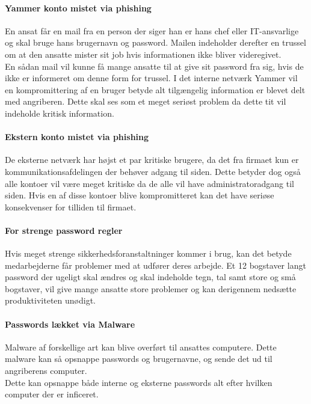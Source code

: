 \documentclass{article}
\begin{document}
\paragraph{Yammer konto mistet via phishing}
En ansat får en mail fra en person der siger han er hans chef eller
IT-ansvarlige og skal bruge hans brugernavn og password. Mailen 
indeholder derefter en trussel om at den ansatte mister sit job hvis 
informationen ikke bliver videregivet.\\
En sådan mail vil kunne få mange ansatte til at give sit password fra
sig, hvis de ikke er informeret om denne form for trussel. 
I det interne netværk Yammer vil en kompromittering af en bruger betyde alt tilgængelig information
er blevet delt med angriberen. 
Dette skal ses som et meget seriøst problem da dette tit vil indeholde kritisk information.

\paragraph{Ekstern konto mistet via phishing}
De eksterne netværk har højst et par kritiske brugere, da det fra firmaet kun er 
kommunikationsafdelingen der behøver adgang til siden. Dette betyder dog også
alle kontoer vil være meget kritiske da de alle vil have administratoradgang til
siden. Hvis en af disse kontoer blive kompromitteret kan det have seriøse konsekvenser
for tilliden til firmaet.

\paragraph{For strenge password regler}
Hvis meget strenge sikkerhedsforanstaltninger kommer i brug, kan det betyde
medarbejderne får problemer med at udfører deres arbejde. Et 12 bogstaver langt
password der ugeligt skal ændres og skal indeholde tegn, tal samt store og små
bogstaver, vil give mange ansatte store problemer og kan derigennem nedsætte
produktiviteten unødigt.

\paragraph{Passwords lækket via Malware}
Malware af forskellige art kan blive overført til ansattes computere. Dette malware
kan så opsnappe passwords og brugernavne, og sende det ud til angriberens computer.\\
Dette kan opsnappe både interne og eksterne passwords alt efter hvilken computer der
er inficeret. 
\end{document}
